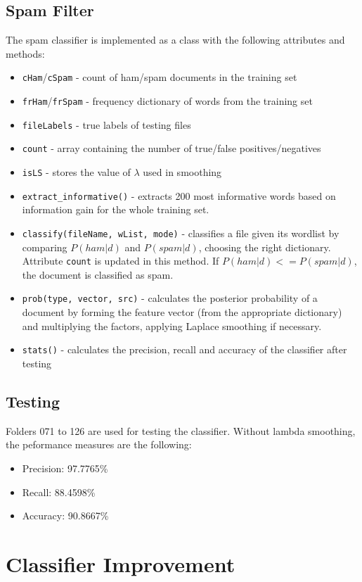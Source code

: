 \documentclass{article}
\begin{document}
\subsection{Spam Filter}
The spam classifier is implemented as a class with the following attributes and methods:
\begin{itemize}
	\item \texttt{cHam}/\texttt{cSpam} - count of ham/spam documents in the training set
	\item \texttt{frHam}/\texttt{frSpam} - frequency dictionary of words from the training set
	\item \texttt{fileLabels} - true labels of testing files
	\item \texttt{count} - array containing the number of true/false positives/negatives
	\item \texttt{isLS} - stores the value of $\lambda$ used in smoothing
	\item \texttt{extract\_informative()} - extracts 200 most informative words based on information gain for the whole training set.
	\item \texttt{classify(fileName, wList, mode)} - classifies a file given its wordlist by comparing $P(ham | d)$ and $P(spam | d)$, choosing the right dictionary. Attribute \texttt{count} is updated in this method. If $P(ham | d) <= P(spam | d)$, the document is classified as spam.
	\item \texttt{prob(type, vector, src)} - calculates the posterior probability of a document by forming the feature vector (from the appropriate dictionary) and multiplying the factors, applying Laplace smoothing if necessary.
	\item \texttt{stats()} - calculates the precision, recall and accuracy of the classifier after testing
\end{itemize}

\subsection{Testing}
Folders 071 to 126 are used for testing the classifier. Without lambda smoothing, the peformance measures are the following:
\begin{itemize}
	\item Precision: 97.7765\%
	\item Recall: 88.4598\%
	\item Accuracy: 90.8667\%
\end{itemize}

\section{Classifier Improvement}
\end{document}
